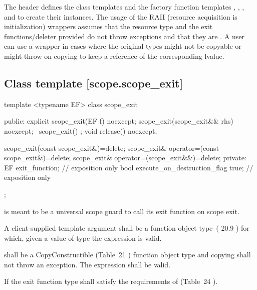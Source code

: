 \documentclass[ebook,11pt,article]{memoir}
\begin{document}
\pnum
The header   defines the class templates   
and the factory function templates , ,
,
 and   to create their instances. The usage of the RAII (resource acquisition is initialization) wrappers assumes that the resource type and the exit functions/deleter provided do not throw exceptions and that they are .
\enternote
A user can use a  wrapper in cases where the original types might not be copyable or might throw on copying to keep a reference of the corresponding lvalue.
\exitnote 

\subsection {Class template  [scope.scope_exit]}

\begin{codeblock}
template <typename EF>
class scope_exit {
public:
  explicit
  scope_exit(EF f) noexcept;
  scope_exit(scope_exit&& rhs) noexcept;
  ~scope_exit() ;
  void release() noexcept;

  scope_exit(const scope_exit&)=delete;
  scope_exit& operator=(const scope_exit&)=delete;
  scope_exit& operator=(scope_exit&&)=delete;
private:
  EF exit_function;    // exposition only
  bool execute_on_destruction_flag {true}; // exposition only
};
\end{codeblock}
\pnum
\enternote
{} is meant to be a universal scope guard to call its exit function on scope exit.
\exitnote

\pnum
A client-supplied template argument
 shall be a function
object type~(
20.9
) 
for which, given
a value  of type  the expression
 is valid.

\pnum
\requires {} shall be a CopyConstructible (Table~21
) function object type and copying shall not throw an exception. 
The expression  shall be valid.

\pnum
If the exit function type  shall satisfy
the requirements of  (Table~24
).
\end{document}
